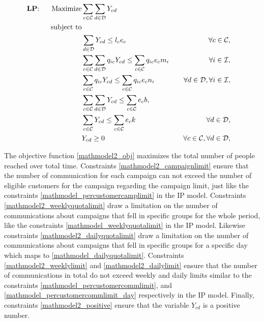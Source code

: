 \documentclass[11pt]{article}
\begin{document}
\begin{align}
\text{\textbf{LP}: \;\;\;\;\;}\text{Maximize} & \displaystyle
\sum\limits_{c\in \mathcal{C}}
\sum\limits_{d\in \mathcal{D}}
Y_{{c}{d}} \label{mathmodel2_obj}&
\\
\text{subject to} \notag\\
&\sum\limits_{d\in\mathcal{D}}Y_{{c}{d}} \leq l_{c}  e_{c} &&&\forall c \in \mathcal{C}, \label{mathmodel2_campaignlimit}&\\
&\sum\limits_{c\in\mathcal{C}}\sum\limits_{d\in\mathcal{D}} q_{{i}{c}} Y_{{c}{d}}\leq \sum\limits_{c\in\mathcal{C}}q_{{i}{c}} e_{c}  m_{i} &&&\forall i \in \mathcal{I}, \label{mathmodel2_weeklyquotalimit}&\\
&\sum\limits_{c\in\mathcal{C}}q_{{i}{c}} Y_{{c}{d}} \leq \sum\limits_{c\in\mathcal{C}}q_{{i}{c}} e_{c} n_{i} &&&\forall d \in \mathcal{D}, \forall i \in \mathcal{I}, \label{mathmodel2_dailyquotalimit}&\\
&\sum\limits_{c\in\mathcal{C}}\sum\limits_{d\in\mathcal{D}}Y_{{c}{d}} \leq \sum\limits_{c\in\mathcal{C}}e_{c}  b, \label{mathmodel2_weeklylimit}&\\
&\sum\limits_{c\in\mathcal{C}}Y_{{c}{d}} \leq \sum\limits_{c\in\mathcal{C}}e_{c} k &&&\forall d \in \mathcal{D},\label{mathmodel2_dailylimit}&\\
&Y_{{c}{d}} \geq 0&&&\forall c \in \mathcal{C}, \forall d \in \mathcal{D}, \label{mathmodel2_positive}
\end{align}

The objective function \eqref{mathmodel2_obj} maximizes the total number of people reached over total time. Constraints \eqref{mathmodel2_campaignlimit} ensure that the number of communication for each campaign can not exceed the number of eligible customers for the campaign regarding the campaign limit, just like the constraints \eqref{mathmodel_percustomercamplimit} in the IP model. Constraints \eqref{mathmodel2_weeklyquotalimit} draw a limitation on the number of communications about campaigns that fell in specific groups for the whole period, like the constraints \eqref{mathmodel_weeklyquotalimit} in the IP model. Likewise constraints \eqref{mathmodel2_dailyquotalimit} draw a limitation on the number of communications about campaigns that fell in specific groups for a specific day which maps to \eqref{mathmodel_dailyquotalimit}. Constraints \eqref{mathmodel2_weeklylimit} and \eqref{mathmodel2_dailylimit} ensure that the number of communications in total do not exceed weekly and daily limits similar to the constraints \eqref{mathmodel_percustomercommlimit}, and \eqref{mathmodel_percustomercommlimit_day} respectively in the IP model. Finally, constraints \eqref{mathmodel2_positive} ensure that the variable $Y_{{c}{d}}$ is a positive number.
\end{document}
